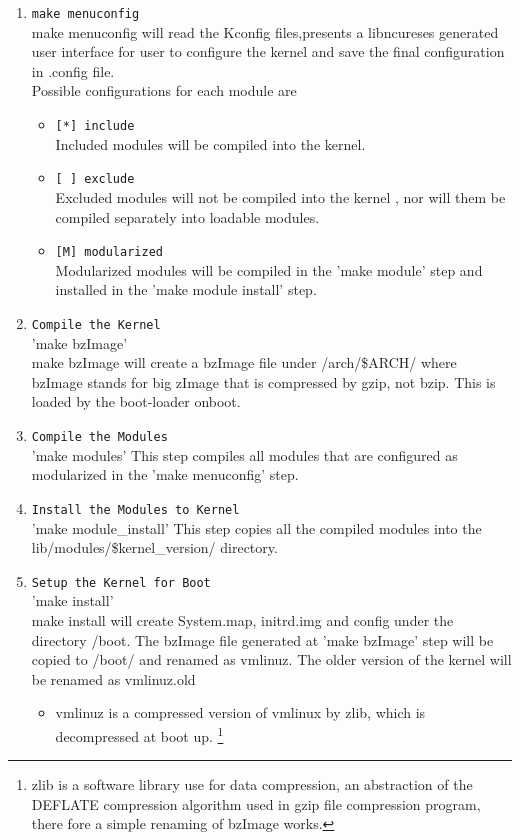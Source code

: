 \documentclass[12pt]{article}
\begin{document}
\begin{enumerate}
\item \verb|make menuconfig|\\
	make menuconfig will read the Kconfig files,presents a libncureses generated user interface for user to configure the kernel and save the final configuration in .config file.\\
	Possible configurations for each module are 
\begin{itemize}
	\item \verb|[*] include|\\
		Included modules will be compiled into the kernel.
	\item \verb|[ ] exclude|\\
		Excluded modules will not be compiled into the kernel , nor will them be compiled separately into loadable modules.
	\item \verb|[M] modularized|\\ 
		Modularized modules will be compiled in the 'make module' step and installed in the 'make module install' step.
\end{itemize}
\item \verb|Compile the Kernel|\\
	'make bzImage'\\
	make bzImage will create a bzImage file under /arch/\$ARCH/ where bzImage stands for big zImage that is compressed by gzip, not bzip. This is loaded by the boot-loader onboot.

\item \verb|Compile the Modules|\\
	'make modules'
	This step compiles all modules that are configured as modularized in the 'make menuconfig' step. 

\item  \verb|Install the Modules to Kernel|\\
	'make module\_install'
	This step copies all the compiled modules into the lib/modules/\$kernel\_version/ directory.

\item \verb|Setup the Kernel for Boot|\\
	'make install'\\
	make install will create System.map, initrd.img and config under the directory /boot. The bzImage file generated at 'make bzImage' step will be copied to /boot/ and renamed as vmlinuz. The older version of the kernel will be renamed as vmlinuz.old
	\begin{itemize}	
	\item vmlinuz is a compressed version of vmlinux by zlib, which is decompressed at boot up. \footnote[1]{zlib is a software library use for data compression, an abstraction of the DEFLATE compression algorithm used in gzip file compression program, there fore a simple renaming of bzImage works.}


\end{itemize}
\end{enumerate}
\end{document}
